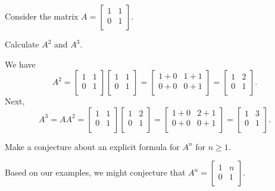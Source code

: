 \begin{exam}
\label{exam_matrix_power}
    Consider the matrix $A = \left[ \begin{array}{cc} 1 & 1\\ 0 & 1 \\ \end{array} \right].$
        \begin{apart}
            \item Calculate $A^2$ and $A^3$.
                \begin{soln}
                    We have
                        $$A^2 =  \left[ \begin{array}{cc} 1 & 1\\ 0 & 1 \\ \end{array} \right] \left[ \begin{array}{cc} 1 & 1\\ 0 & 1 \\ \end{array} \right] 
                        = \left[ \begin{array}{cc} 1+0 & 1+1\\ 0+0 & 0+1 \\ \end{array} \right] 
                        =  \left[ \begin{array}{cc} 1 & 2\\ 0 & 1 \\ \end{array} \right].$$
                    Next, $$A^3 =  AA^2= \left[ \begin{array}{cc} 1 & 1\\ 0 & 1 \\ \end{array} \right] \left[ \begin{array}{cc} 1 & 2\\ 0 & 1 \\ \end{array} \right] 
                    =  \left[ \begin{array}{cc} 1+0 & 2+1\\ 0+0 & 0+1 \\ \end{array} \right]
                    =  \left[ \begin{array}{cc} 1 & 3\\ 0 & 1 \\ \end{array} \right].$$
                \end{soln}
            \item Make a conjecture about an explicit formula for $A^n$ for $n \ge 1$.
                \begin{soln}
                    Based on our examples, we might conjecture that 
                        $A^n=\left[ \begin{array}{cc} 1 & n\\ 0 & 1 \\ \end{array} \right].$
                \end{soln} 
        \end{apart}
\end{exam}

